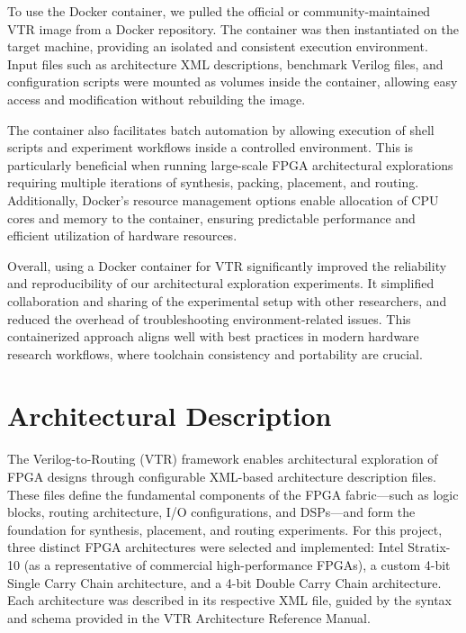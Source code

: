 To use the Docker container, we pulled the official or community-maintained VTR image from a Docker repository. The container was then instantiated on the target machine, providing an isolated and consistent execution environment. Input files such as architecture XML descriptions, benchmark Verilog files, and configuration scripts were mounted as volumes inside the container, allowing easy access and modification without rebuilding the image.

The container also facilitates batch automation by allowing execution of shell scripts and experiment workflows inside a controlled environment. This is particularly beneficial when running large-scale FPGA architectural explorations requiring multiple iterations of synthesis, packing, placement, and routing. Additionally, Docker’s resource management options enable allocation of CPU cores and memory to the container, ensuring predictable performance and efficient utilization of hardware resources.

Overall, using a Docker container for VTR significantly improved the reliability and reproducibility of our architectural exploration experiments. It simplified collaboration and sharing of the experimental setup with other researchers, and reduced the overhead of troubleshooting environment-related issues. This containerized approach aligns well with best practices in modern hardware research workflows, where toolchain consistency and portability are crucial.

\section{Architectural Description}
The Verilog-to-Routing (VTR) framework enables architectural exploration of FPGA designs through configurable XML-based architecture description files. These files define the fundamental components of the FPGA fabric—such as logic blocks, routing architecture, I/O configurations, and DSPs—and form the foundation for synthesis, placement, and routing experiments. For this project, three distinct FPGA architectures were selected and implemented: Intel Stratix-10 (as a representative of commercial high-performance FPGAs), a custom 4-bit Single Carry Chain architecture, and a 4-bit Double Carry Chain architecture. Each architecture was described in its respective XML file, guided by the syntax and schema provided in the VTR Architecture Reference Manual.

